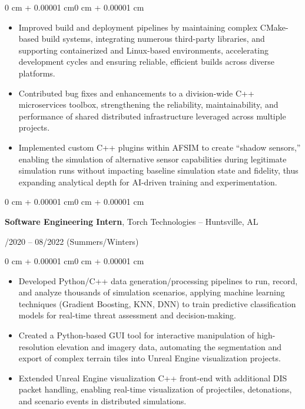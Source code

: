 \documentclass[11pt, letterpaper]{article}
\newenvironment{highlights}{
    \begin{itemize}[
        topsep=0.10 cm,
        parsep=0.10 cm,
        partopsep=0pt,
        itemsep=0pt,
        leftmargin=0.4 cm + 10pt
    ]
}{
    \end{itemize}
}
\newenvironment{onecolentry}{
    \begin{adjustwidth}{0 cm + 0.00001 cm}{0 cm + 0.00001 cm}
}{
    \end{adjustwidth}
}
\newenvironment{twocolentry}[1]{
    \onecolentry
    \def\secondColumn{#1}
    \setcolumnwidth{\fill,4.5cm}
    \begin{paracol}{2}
}{
    \switchcolumn \raggedleft \secondColumn
    \end{paracol}
    \endonecolentry
}
\begin{document}
\begin{onecolentry}
\begin{highlights}
        \item Improved build and deployment pipelines by maintaining complex CMake-based build systems, integrating numerous third-party libraries, and supporting containerized and Linux-based environments, accelerating development cycles and ensuring reliable, efficient builds across diverse platforms.
        \item Contributed bug fixes and enhancements to a division-wide C++ microservices toolbox, strengthening the reliability, maintainability, and performance of shared distributed infrastructure leveraged across multiple projects.
        \item Implemented custom C++ plugins within AFSIM to create “shadow sensors,” enabling the simulation of alternative sensor capabilities during legitimate simulation runs without impacting baseline simulation state and fidelity, thus expanding analytical depth for AI-driven training and experimentation.
    \end{highlights}
\end{onecolentry}

\vspace{0.4cm}

\begin{twocolentry}{05/2020 – 08/2022 (Summers/Winters)}
    \textbf{Software Engineering Intern}, Torch Technologies -- Huntsville, AL
\end{twocolentry}

\vspace{0.10 cm}
\begin{onecolentry}
    \begin{highlights}
        \item Developed Python/C++ data generation/processing pipelines to run, record, and analyze thousands of simulation scenarios, applying machine learning techniques (Gradient Boosting, KNN, DNN) to train predictive classification models for real-time threat assessment and decision-making.
        \item Created a Python-based GUI tool for interactive manipulation of high-resolution elevation and imagery data, automating the segmentation and export of complex terrain tiles into Unreal Engine visualization projects.
        \item Extended Unreal Engine visualization C++ front-end with additional DIS packet handling, enabling real-time visualization of projectiles, detonations, and scenario events in distributed simulations.
    \end{highlights}
\end{onecolentry}
\end{document}
